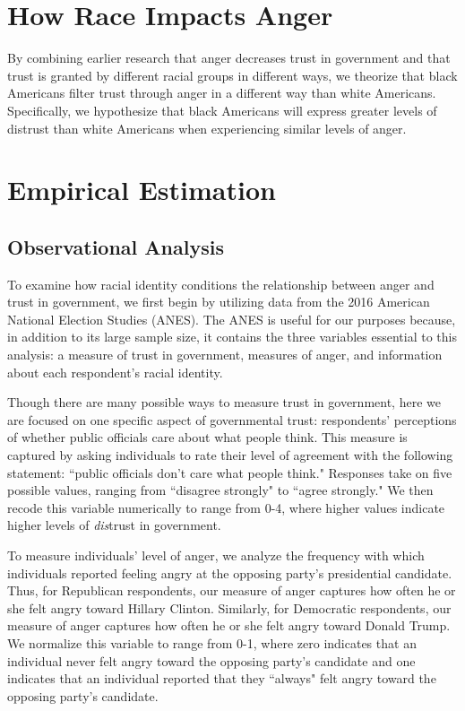\documentclass[12pt, letterpaper]{article}
\begin{document}
\section{How Race Impacts Anger}
\label{sec:theory}

By combining earlier research that anger decreases trust in government and that trust is granted by different racial groups in different ways, we theorize that  
black Americans filter trust through anger in a different way than white Americans. Specifically, we hypothesize that black Americans will express greater levels of distrust than white Americans when experiencing similar levels of anger. 

\section{Empirical Estimation}
\label{sec:design}

\subsection{Observational Analysis}
\label{subsec:anes}

To examine how racial identity conditions the relationship between anger and trust in government, we first begin by utilizing data from the 2016 American National Election Studies (ANES). The ANES is useful for our purposes because, in addition to its large sample size, it contains the three variables essential to this analysis: a measure of trust in government, measures of anger, and information about each respondent's racial identity.

Though there are many possible ways to measure trust in government, here we are focused on one specific aspect of governmental trust: respondents' perceptions of whether public officials care about what people think. This measure is captured by asking individuals to rate their level of agreement with the following statement: ``public officials don't care what people think." Responses take on five possible values, ranging from ``disagree strongly" to ``agree strongly." We then recode this variable numerically to range from 0-4, where higher values indicate higher levels of \emph{dis}trust in government.

To measure individuals' level of anger, we analyze the frequency with which individuals reported feeling angry at the opposing party's presidential candidate. Thus, for Republican respondents, our measure of anger captures how often he or she felt angry toward Hillary Clinton. Similarly, for Democratic respondents, our measure of anger captures how often he or she felt angry toward Donald Trump. We normalize this variable to range from 0-1, where zero indicates that an individual never felt angry toward the opposing party's candidate and one indicates that an individual reported that they ``always" felt angry toward the opposing party's candidate. 
\end{document}
